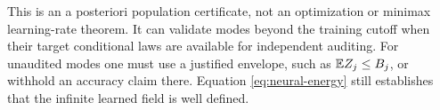 This is an a posteriori population certificate, not an optimization or minimax learning-rate theorem. It can validate modes beyond the training cutoff when their target conditional laws are available for independent auditing. For unaudited modes one must use a justified envelope, such as $\mathbb E Z_j\le B_j$, or withhold an accuracy claim there. Equation \eqref{eq:neural-energy} still establishes that the infinite learned field is well defined.
